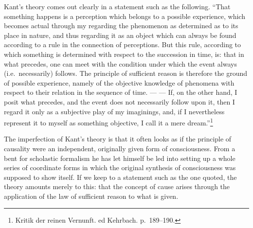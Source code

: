\documentclass[12pt,a4paper]{book}
\newcommand{\opage}[1]{\marginnote{\footnotesize\textit{[#1]}}}
\begin{document}
Kant's theory comes out clearly in a statement such as the following.
``That something happens is a perception which belongs to a possible
experience, which becomes actual through my regarding the phenomenon as
determined as to its place in nature, and thus regarding it as an object
which can always be found according to a rule in the connection of
perceptions. But this rule, according to which something is determined
with respect to the succession in time, is: that in what
\opage{258}precedes, one can meet with the condition under which the
event always (i.e.\ necessarily) follows. The principle of sufficient
reason is therefore the ground of possible experience, namely of the
objective knowledge of phenomena with respect to their relation in the
sequence of time. --- --- If, on the other hand, I posit what precedes,
and the event does not necessarily follow upon it, then I regard it only
as a subjective play of my imaginings, and, if I nevertheless represent
it to myself as something objective, I call it a mere
dream.''\footnote{Kritik der reinen Vernunft. ed Kehrbach. p.~189--190.}

The imperfection of Kant's theory is that it often looks as if the
principle of causality were an independent, originally given form of
consciousness. From a bent for scholastic formalism he has let himself be
led into setting up a whole series of coordinate forms in which the
original synthesis of consciousness was supposed to show itself. If we
keep to a statement such as the one quoted, the theory amounts merely to
this: that the concept of cause arises through the application of the
law of sufficient reason to what is given.
\end{document}
